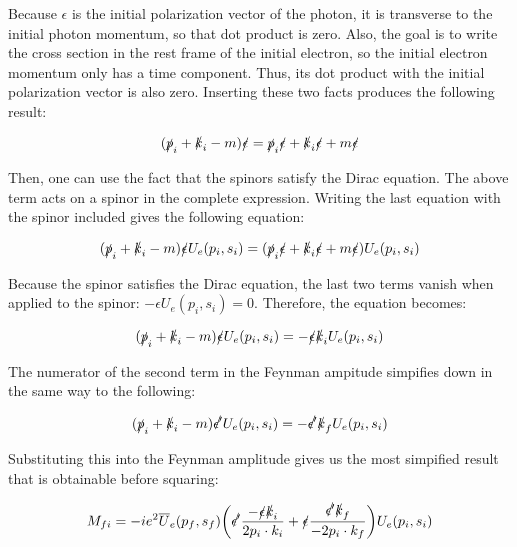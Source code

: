 \documentclass[a4]{article}
\begin{document}
    Because $\epsilon$ is the initial polarization vector of the photon, it is transverse to the initial photon momentum, so that dot product is zero. Also, the goal is to write the cross section in
    the rest frame of the initial electron, so the initial electron momentum only has a time component. Thus, its dot product with the initial polarization vector is also zero. Inserting these two
    facts produces the following result:

    \begin{equation}
        (\slashed{p}_i + \slashed{k}_i - m) \slashed{\epsilon} = \slashed{p}_i \slashed{\epsilon} + \slashed{k}_i \slashed{\epsilon} + m \slashed{\epsilon}
    \end{equation}

    Then, one can use the fact that the spinors satisfy the Dirac equation. The above term acts on a spinor in the complete expression. Writing the last equation with the spinor included gives the
    following equation:

    \begin{equation}
        (\slashed{p}_i + \slashed{k}_i - m) \slashed{\epsilon} U_e (p_i, s_i) = (\slashed{p}_i \slashed{\epsilon} + \slashed{k}_i \slashed{\epsilon} + m \slashed{\epsilon}) U_e (p_i, s_i)
    \end{equation}

    Because the spinor satisfies the Dirac equation, the last two terms vanish when applied to the spinor: $- \epsilon U_e (p_i, s_i) = 0$. Therefore, the equation becomes:

    \begin{equation}
        (\slashed{p}_i + \slashed{k}_i - m) \slashed{\epsilon} U_e (p_i, s_i) = - \slashed{\epsilon} \slashed{k}_i U_e (p_i, s_i)
    \end{equation}

    The numerator of the second term in the Feynman ampitude simpifies down in the same way to the following:

    \begin{equation}
        (\slashed{p}_i + \slashed{k}_i - m) \slashed{\epsilon'} U_e (p_i, s_i) = - \slashed{\epsilon'} \slashed{k}_f U_e (p_i, s_i)
    \end{equation}

    Substituting this into the Feynman amplitude gives us the most simpified result that is obtainable before squaring:

    \begin{equation}
        M_{fi} = - i e^2 \overline{U}_e (p_f, s_f) \bigg( \slashed{\epsilon'} \frac{- \slashed{\epsilon} \slashed{k}_i}{2 p_i \cdot k_i} + \slashed{\epsilon} \frac{\slashed{\epsilon'} \slashed{k}_f}{- 2 p_i \cdot k_f} \bigg) U_e (p_i, s_i)
    \end{equation}
\end{document}
